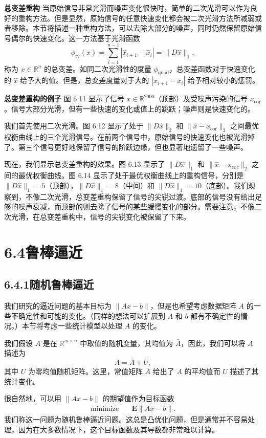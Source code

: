 \documentclass[UTF8, 12pt, fontset=fandol, oneside]{ctexart}
\begin{document}
\noindent\textbf{总变差重构}\quad
当原始信号非常光滑而噪声变化很快时，简单的二次光滑可以作为良好的重构方法。但是显然，原始信号的任意快速变化都会被二次光滑方法所减弱或者移除。本节将描述一种重构方法，可以去除大部分的噪声，同时仍然保留原始信号偶尔的快速变化。这一方法基于光滑函数
\[
\phi_{\mathrm{tv}}(\hat{x})=\sum_{i=1}^{n-1}|\hat{x}_{i+1}-\hat{x}_i|=\|D\hat{x}\|_1,
\]
称为 $x\in\mathbb{R}^n$ 的总变差。如同二次光滑性的度量 $\phi_{\mathrm{quad}}$，总变差函数对于快速变化的 $\hat{x}$ 给予大的值。但是，总变差度量对于大的 $|x_{i+1}-x_i|$ 给予相对较小的惩罚。

\noindent\textbf{总变差重构的例子}\quad
图 6.11 显示了信号 $x\in\mathbb{R}^{2000}$（顶部）及受噪声污染的信号 $x_{\mathrm{cor}}$。信号大部分光滑，但有一些快速的变化或值上的跳跃；噪声则是快速变化的。

我们首先使用二次光滑。图 6.12 显示了处于 $\|D\hat{x}\|_2$ 和 $\|\hat{x}-x_{\mathrm{cor}}\|_2$ 之间最优权衡曲线上的三个光滑信号。在前两个信号中，原始信号的快速变化也被光滑掉了。第三个信号更好地保留了信号的阶跃边缘，但也显著地遗留了一些噪声。

现在，我们显示总变差重构的效果。图 6.13 显示了 $\|D\hat{x}\|_1$ 和 $\|\hat{x}-x_{\mathrm{cor}}\|_2$ 之间的最优权衡曲线。图 6.14 显示了处于最优权衡曲线上的重构信号，分别是 $\|D\hat{x}\|_1=5$（顶部），$\|D\hat{x}\|_1=8$（中间）和 $\|D\hat{x}\|_1=10$（底部）。我们观察到，不像二次光滑，总变差重构保留了信号的尖锐过渡。底部的信号没有给出足够的噪声衰减，而顶部的则去除了信号的某些缓慢变化的部分。需要注意，不像二次光滑，在总变差重构中，信号的尖锐变化被保留了下来。

\section*{6.4\quad 鲁棒逼近}

\subsection*{6.4.1\quad 随机鲁棒逼近}

我们研究的逼近问题的基本目标为 $\|Ax-b\|$，但是也希望考虑数据矩阵 $A$ 的一些不确定性和可能的变化。（同样的想法可以扩展到 $A$ 和 $b$ 都有不确定性的情况。）本节将考虑一些统计模型以处理 $A$ 的变化。

我们假设 $A$ 是在 $\mathbb{R}^{m\times n}$ 中取值的随机变量，其均值为 $\bar{A}$，因此，我们可以将 $A$ 描述为
\[
A=\bar{A}+U,
\]
其中 $U$ 为零均值随机矩阵。这里，常值矩阵 $\bar{A}$ 给出了 $A$ 的平均值而 $U$ 描述了其统计变化。

很自然地，可以用 $\|Ax-b\|$ 的期望值作为目标函数
\begin{equation}
\begin{aligned}
\text{minimize}\quad & \mathbf{E}\|Ax-b\|.
\end{aligned}
\tag{6.13}
\end{equation}
我们称这一问题为随机鲁棒逼近问题。这总是凸优化问题，但是通常并不容易处理，因为在大多数情况下，这个目标函数及其导数都非常难以计算。
\end{document}
